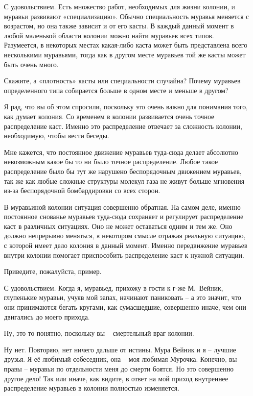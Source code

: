 \documentclass[../main.tex]{subfiles}
\begin{document}
\begin{dialogue}
 С удовольствием. Есть множество работ, необходимых для жизни колонии, и муравьи развивают «специализацию». Обычно специальность муравья меняется с возрастом, но она также зависит и от его касты. В каждый данный момент в любой маленькой области колонии можно найти муравьев всех типов. Разумеется, в некоторых местах какая-либо каста может быть представлена всего несколькими муравьями, тогда как в другом месте муравьев той же касты может быть очень много.

 Скажите, а «плотность» касты или специальности случайна? Почему муравьев определенного типа собирается больше в одном месте и меньше в другом?

 Я рад, что вы об этом спросили, поскольку это очень важно для понимания того, как думает колония. Со временем в колонии развивается очень точное распределение каст. Именно это распределение отвечает за сложность колонии, необходимую, чтобы вести беседы.

 Мне кажется, что постоянное движение муравьев туда-сюда делает абсолютно невозможным какое бы то ни было точное распределение. Любое такое распределение было бы тут же нарушено беспорядочным движением муравьев, так же как любые сложные структуры молекул газа не живут больше мгновения из-за беспорядочной бомбардировки со всех сторон.

 В муравьиной колонии ситуация совершенно обратная. На самом деле, именно постоянное снованье муравьев туда-сюда сохраняет и регулирует распределение каст в различных ситуациях. Оно не может оставаться одним и тем же. Оно должно непрерывно меняться, в некотором смысле отражая реальную ситуацию, с которой имеет дело колония в данный момент. Именно передвижение муравьев внутри колонии помогает приспособить распределение каст к нужной ситуации.

 Приведите, пожалуйста, пример.

 С удовольствием. Когда я, муравьед, прихожу в гости к г-же М.~Вейник, глупенькие муравьи, учуяв мой запах, начинают паниковать \--- а это значит, что они принимаются бегать кругами, как сумасшедшие, совершенно иначе, чем они двигались до моего прихода.

 Ну, это-то понятно, поскольку вы \--- смертельный враг колонии.

 Ну нет. Повторяю, нет ничего дальше от истины. Мура Вейник и я \--- лучшие друзья. Я её любимый собеседник, она \--- моя любимая Мурочка. Конечно, вы правы \--- муравьи по отдельности меня до смерти боятся. Но это совершенно другое дело! Так или иначе, как видите, в ответ на мой приход внутреннее распределение муравьев в колонии полностью изменяется.


\end{dialogue}
\end{document}
